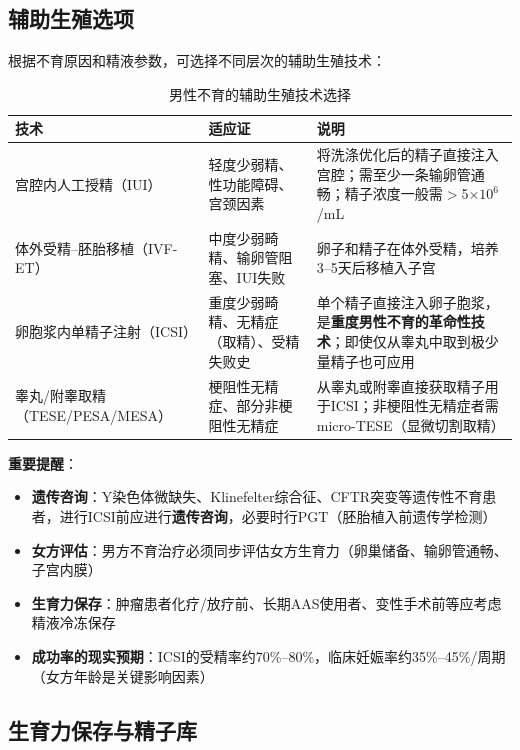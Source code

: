 \subsection{辅助生殖选项}

根据不育原因和精液参数，可选择不同层次的辅助生殖技术：

\begin{table}[htbp]
\centering
\caption{男性不育的辅助生殖技术选择}
\label{tab:art_options}
\begin{tabularx}{\textwidth}{@{}lXX@{}}
    \toprule
    \textbf{技术} & \textbf{适应证} & \textbf{说明} \\
    \midrule
    宫腔内人工授精（IUI） & 轻度少弱精、性功能障碍、宫颈因素 & 将洗涤优化后的精子直接注入宫腔；需至少一条输卵管通畅；精子浓度一般需$>$5$\times10^6$/mL \\
    \midrule
    体外受精--胚胎移植（IVF-ET） & 中度少弱畸精、输卵管阻塞、IUI失败 & 卵子和精子在体外受精，培养3--5天后移植入子宫 \\
    \midrule
    卵胞浆内单精子注射（ICSI） & 重度少弱畸精、无精症（取精）、受精失败史 & 单个精子直接注入卵子胞浆，是\textbf{重度男性不育的革命性技术}；即使仅从睾丸中取到极少量精子也可应用 \\
    \midrule
    睾丸/附睾取精（TESE/PESA/MESA） & 梗阻性无精症、部分非梗阻性无精症 & 从睾丸或附睾直接获取精子用于ICSI；非梗阻性无精症者需micro-TESE（显微切割取精） \\
    \bottomrule
\end{tabularx}
\end{table}

\textbf{重要提醒}：
\begin{itemize}[leftmargin=2cm]
	\item \textbf{遗传咨询}：Y染色体微缺失、Klinefelter综合征、CFTR突变等遗传性不育患者，进行ICSI前应进行\textbf{遗传咨询}，必要时行PGT（胚胎植入前遗传学检测）
	\item \textbf{女方评估}：男方不育治疗必须同步评估女方生育力（卵巢储备、输卵管通畅、子宫内膜）
	\item \textbf{生育力保存}：肿瘤患者化疗/放疗前、长期AAS使用者、变性手术前等应考虑精液冷冻保存
	\item \textbf{成功率的现实预期}：ICSI的受精率约70\%--80\%，临床妊娠率约35\%--45\%/周期（女方年龄是关键影响因素）
\end{itemize}

\subsection{生育力保存与精子库}

